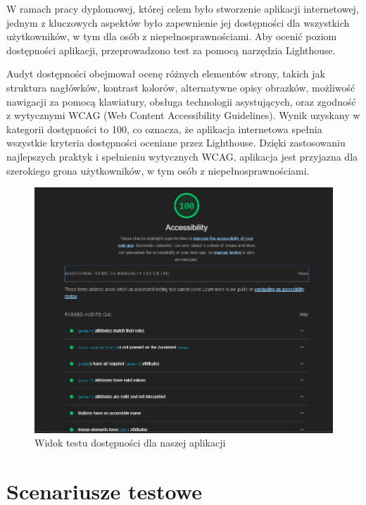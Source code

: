 \indent  W ramach pracy dyplomowej, której celem było stworzenie aplikacji internetowej, jednym z kluczowych aspektów było zapewnienie jej dostępności 
dla wszystkich użytkowników, w tym dla osób z niepełnosprawnościami.
 Aby ocenić poziom dostępności aplikacji, przeprowadzono test za pomocą narzędzia Lighthouse.

 Audyt dostępności obejmował ocenę różnych elementów strony, takich jak 
 struktura nagłówków, kontrast kolorów, alternatywne opisy obrazków, możliwość nawigacji za pomocą klawiatury, 
 obsługa technologii asystujących, oraz zgodność z wytycznymi WCAG (Web Content Accessibility Guidelines). \newline
 \indent Wynik uzyskany w kategorii dostępności to 100, co oznacza, że aplikacja internetowa spełnia wszystkie kryteria dostępności oceniane przez Lighthouse.
 Dzięki zastosowaniu najlepszych praktyk i spełnieniu wytycznych WCAG, aplikacja jest przyjazna dla szerokiego grona użytkowników, w tym osób z niepełnosprawnościami.
\begin{figure}[H]
    \centering
    \includegraphics[width=1\textwidth]{attachments/testy-dostepnosci}
    \caption{Widok testu dostępności dla naszej aplikacji}
    \label{fig:testy-dostepnosci-zdjecie}
    \end{figure}


\section{Scenariusze testowe}
\label{sec:scenariusze-testowe}

